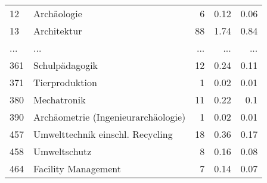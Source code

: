 \begin{longtable}{lXrrr}
        12 & \multicolumn{1}{X}{Archäologie} & %
          \num{6} &
          \num[round-mode=places,round-precision=2]{0.12} &
          \num[round-mode=places,round-precision=2]{0.06} \\
        13 & \multicolumn{1}{X}{Architektur} & %
          \num{88} &
          \num[round-mode=places,round-precision=2]{1.74} &
          \num[round-mode=places,round-precision=2]{0.84} \\
       ... & ... & ... & ... & ... \\
        361 & \multicolumn{1}{X}{Schulpädagogik} & %
          \num{12} &
          \num[round-mode=places,round-precision=2]{0.24} &
          \num[round-mode=places,round-precision=2]{0.11} \\

        371 & \multicolumn{1}{X}{Tierproduktion} & %
          \num{1} &
          \num[round-mode=places,round-precision=2]{0.02} &
          \num[round-mode=places,round-precision=2]{0.01} \\

        380 & \multicolumn{1}{X}{Mechatronik} & %
          \num{11} &
          \num[round-mode=places,round-precision=2]{0.22} &
          \num[round-mode=places,round-precision=2]{0.1} \\

        390 & \multicolumn{1}{X}{Archäometrie (Ingenieurarchäologie)} & %
          \num{1} &
          \num[round-mode=places,round-precision=2]{0.02} &
          \num[round-mode=places,round-precision=2]{0.01} \\

        457 & \multicolumn{1}{X}{Umwelttechnik einschl. Recycling} & %
          \num{18} &
          \num[round-mode=places,round-precision=2]{0.36} &
          \num[round-mode=places,round-precision=2]{0.17} \\

        458 & \multicolumn{1}{X}{Umweltschutz} & %
          \num{8} &
          \num[round-mode=places,round-precision=2]{0.16} &
          \num[round-mode=places,round-precision=2]{0.08} \\

        464 & \multicolumn{1}{X}{Facility Management} & %
          \num{7} &
          \num[round-mode=places,round-precision=2]{0.14} &
          \num[round-mode=places,round-precision=2]{0.07} \\


\end{longtable}

